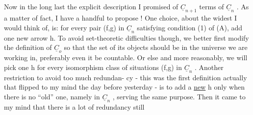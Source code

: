   Now in the long last the explicit description I promised of $\underline{C}_{n+1}$  
terms of $\underline{C}_n$ . As a matter of fact, I have a handful to propose ! One 
choice, about the widest I would think of, is: for every pair (f,g)
in $\underline{C}_n$ satisfying condition (1) of (A), add one  new arrow h. To
avoid set-theoretic difficulties though, we better  first modify
the definition of $\underline{C}_o$ so that the set of its objects should be in the
universe we are working in, preferably even it be countable. Or else
and more reasonably, we will pick one h for every isomorphism class of
situations (f,g) in $\underline{C}_n$ . Another restriction\hand{,} to avoid too much redundan-%
cy - this was the first definition actually that flipped to my mind the
day before yesterday - is to add a \uline{new} h only when there is no ``old''
one, namely in $\underline{C}_n$ , serving the same purpose. Then it came to my mind
that there is a lot of redundancy still\hand{:} 
